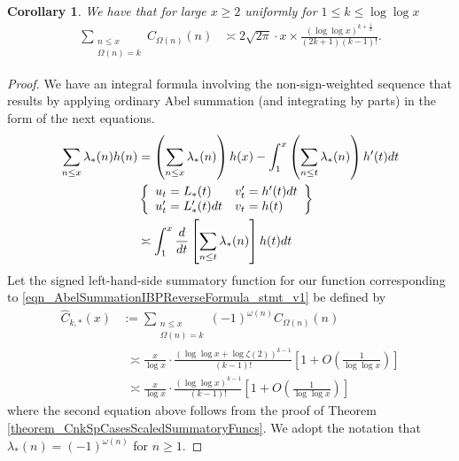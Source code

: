 \documentclass[11pt,reqno,a4letter]{article}
\numberwithin{figure}{section}
\numberwithin{table}{section}
\theoremstyle{plain}
\newtheorem{cor}[theorem]{Corollary}
\numberwithin{theorem}{section}
\theoremstyle{definition}
\begin{document}
\begin{cor} 
\label{cor_SummatoryFuncsOfUnsignedSeqs_v2} 
We have that for large $x \geq 2$ uniformly for $1 \leq k \leq \log\log x$ 
\begin{align*} 
\sum_{\substack{n \leq x \\ \Omega(n) = k}} C_{\Omega(n)}(n) & \asymp 
     2\sqrt{2\pi} \cdot x \times 
     \frac{(\log\log x)^{k+\frac{1}{2}}}{(2k+1)(k-1)!}. 
\end{align*} 
\end{cor} 
\begin{proof} 
We have an integral formula involving the non-sign-weighted 
sequence that results by 
applying ordinary Abel summation (and integrating by parts) in the form of 
the next equations. 
\begin{align} 
\label{eqn_AbelSummationIBPReverseFormula_stmt_v1} 
\sum_{n \leq x} \lambda_{\ast}(n) h(n) & = \left(\sum_{n \leq x} \lambda_{\ast}(n)\right) h(x) - 
     \int_{1}^{x} \left(\sum_{n \leq t} \lambda_{\ast}(n)\right) h^{\prime}(t) dt \\ 
\notag 
     & \left\{\begin{array}{ll} 
     u_t = L_{\ast}(t) & v_t^{\prime} = h^{\prime}(t) dt \\ 
     u_t^{\prime} = L_{\ast}^{\prime}(t) dt & v_t = h(t) 
     \end{array} 
     \right\} \\ 
     & \asymp 
     \int_1^{x} \frac{d}{dt}\left[\sum_{n \leq t} \lambda_{\ast}(n)\right] h(t) dt
\end{align} 
Let the signed left-hand-side summatory function for our function 
corresponding to \eqref{eqn_AbelSummationIBPReverseFormula_stmt_v1} be defined by 
\begin{align*} 
\widehat{C}_{k,\ast}(x) & := \sum_{\substack{n \leq x \\ \Omega(n)=k}} 
     (-1)^{\omega(n)} C_{\Omega(n)}(n) \\ 
     & \phantom{:} \asymp  
     \frac{x}{\log x} \cdot \frac{(\log\log x + \log\zeta(2))^{k-1}}{(k-1)!} \left[ 
     1 + O\left(\frac{1}{\log\log x}\right)\right] \\ 
     & \phantom{:} \asymp 
     \frac{x}{\log x} \cdot \frac{(\log\log x)^{k-1}}{(k-1)!} \left[ 
     1 + O\left(\frac{1}{\log\log x}\right)\right]
\end{align*} 
where the second equation above follows from the proof of 
Theorem \ref{theorem_CnkSpCasesScaledSummatoryFuncs}. 
We adopt the notation that $\lambda_{\ast}(n) = (-1)^{\omega(n)}$ for $n \geq 1$. 


\end{proof}
\end{document}
